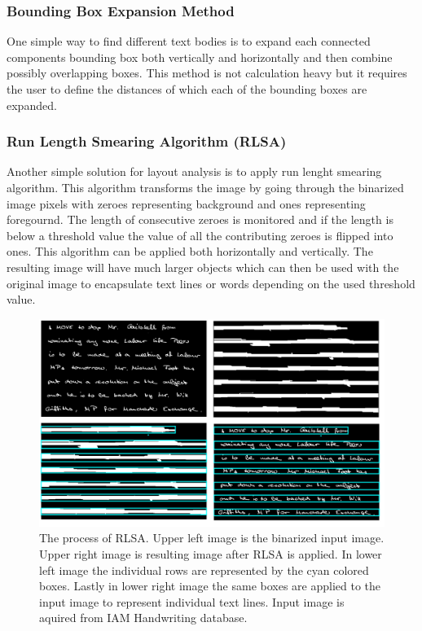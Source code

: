 \documentclass{article}
\begin{document}
        \subsubsection{Bounding Box Expansion Method}
          One simple way to find different text bodies is to expand each connected components bounding box both vertically and horizontally and then combine possibly overlapping boxes. This method is not calculation heavy but it requires the user to define the distances of which each of the bounding boxes are expanded.

        \subsubsection{Run Length Smearing Algorithm (RLSA)}
          Another simple solution for layout analysis is to apply run lenght smearing algorithm. This algorithm transforms the image by going through the binarized image pixels with zeroes representing background and ones representing foregournd. The length of consecutive zeroes is monitored and if the length is below a threshold value the value of all the contributing zeroes is flipped into ones. This algorithm can be applied both horizontally and vertically. The resulting image will have much larger objects which can then be used with the original image to encapsulate text lines or words depending on the used threshold value.

          \begin{figure}
            \centering
            \includegraphics[natwidth=1516,natheight=912,scale=0.3]{rlsademo.png}
            \caption{The process of RLSA. Upper left image is the binarized input image. Upper right image is resulting image after RLSA is applied. In lower left image the individual rows are represented by the cyan colored boxes. Lastly in lower right image the same boxes are applied to the input image to represent individual text lines. Input image is aquired from IAM Handwriting database. \label{fig:workingrlsa} }
          \end{figure}
\end{document}
